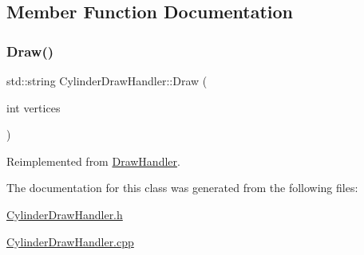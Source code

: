 \subsection{Member Function Documentation}
\mbox{\label{class_cylinder_draw_handler_ac2ca330f3084182da1bd3db358bb996d}} 
\subsubsection{\texorpdfstring{Draw()}{Draw()}}
{\footnotesize\ttfamily std\+::string Cylinder\+Draw\+Handler\+::\+Draw (\begin{DoxyParamCaption}\item[{int}]{vertices }\end{DoxyParamCaption})\hspace{0.3cm}{\ttfamily [virtual]}}



Reimplemented from \mbox{\hyperlink{class_draw_handler_af52aafccdd1397441a17a2d36174a1e4}{Draw\+Handler}}.



The documentation for this class was generated from the following files\+:\begin{DoxyCompactItemize}
\item 
\mbox{\hyperlink{_cylinder_draw_handler_8h}{Cylinder\+Draw\+Handler.\+h}}\item 
\mbox{\hyperlink{_cylinder_draw_handler_8cpp}{Cylinder\+Draw\+Handler.\+cpp}}\end{DoxyCompactItemize}
